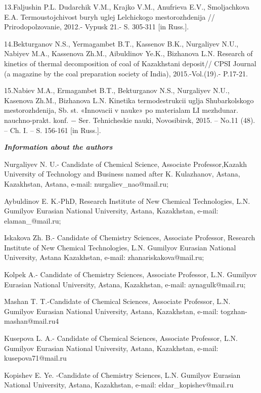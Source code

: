 13.Faljushin P.L. Dudarchik V.M., Krajko V.M., Anufrieva E.V.,
Smoljachkova E.A. Termoustojchivost\textquotesingle{} buryh uglej
Lel\textquotesingle chickogo mestorozhdenija //
Prirodopol\textquotesingle zovanie, 2012.- Vypusk 21.- S. 305-311 {[}in
Russ.{]}.

14.Bekturganov N.S., Yermagambet B.T., Kassenov B.K., Nurgaliyev N.U.,
Nabiyev M.A., Kassenova Zh.M., Aibuldinov Ye.K., Bizhanova L.N. Research
of kinetics of thermal decomposition of coal of Kazakhstani deposit//
CPSI Journal (a magazine by the coal preparation society of India),
2015.-Vol.(19).- P.17-21.

15.Nabiev M.A., Ermagambet B.T., Bekturganov N.S., Nurgaliyev N.U.,
Kasenova Zh.M., Bizhanova L.N. Kinetika termodestrukcii uglja
Shubarkol\textquotesingle skogo mestorozhdenija, Sb. st. «Innovacii v
nauke» po materialam LI mezhdunar. nauchno-prakt. konf. − Ser.
Tehnicheskie nauki, Novosibirsk, 2015. -- No.11 (48). -- Ch. I. -- S.
156-161 {[}in Russ.{]}.

\emph{\textbf{Information about the authors}}

Nurgaliyev N. U.- Candidate of Chemical Science, Associate
Professor,Kazakh University of Technology and Business named after K.
Kulazhanov, Astana, Kazakhstan, Astana, e-mail: nurgaliev\_nao@mail.ru;

Aybuldinov E. K.-PhD, Research Institute of New Chemical Technologies,
L.N. Gumilyov Eurasian National University, Astana, Kazakhstan, e-mail:
elaman\_@mail.ru;

Iskakova Zh. B.- Candidate of Chemistry Sciences, Associate Professor,
Research Institute of New Chemical Technologies, L.N. Gumilyov Eurasian
National University, Astana Kazakhstan, e-mail: zhanariskakova@mail.ru;

Kolpek A.- Candidate of Chemistry Sciences, Associate Professor, L.N.
Gumilyov Eurasian National University, Astana, Kazakhstan, e-mail:
aynagulk@mail.ru;

Mashan T. T.-Candidate of Chemical Sciences, Associate Professor, L.N.
Gumilyov Eurasian National University, Astana, Kazakhstan, e-mail:
togzhan-mashan@mail.ru4

Kusepova L. A.- Candidate of Chemical Sciences, Associate Professor,
L.N. Gumilyov Eurasian National University, Astana, Kazakhstan, e-mail:
kusepova71@mail.ru

Kopishev E. Ye. -Candidate of Chemistry Sciences, L.N. Gumilyov Eurasian
National University, Astana, Kazakhstan, e-mail: eldar\_kopishev@mail.ru

